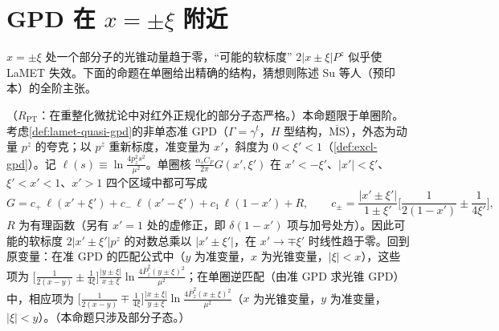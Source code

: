\section{GPD 在 $x=\pm\xi$ 附近}\label{sec:yzliu-gpd}

$x=\pm\xi$ 处一个部分子的光锥动量趋于零，“可能的软标度” $2|x\pm\xi|P^z$ 似乎使 LaMET 失效。下面的命题在单圈给出精确的结构，猜想则陈述 Su 等人\cite{Su:2026eta}（预印本）的全阶主张。

\begin{proposition}[准 GPD 单圈匹配核在 $x=\pm\xi$ 附近的结构 \tagR]\label{prop:yzliu-gpd-oneloop}
（$R_{\mathrm{PT}}$：在重整化微扰论中对红外正规化的部分子态严格。）本命题限于单圈阶。考虑\cref{def:lamet-quasi-gpd}的非单态准 GPD（$\Gamma=\gamma^t$，$H$ 型结构，$\overline{\mathrm{MS}}$），外态为动量 $p^z$ 的夸克；以 $p^z$ 重新标度，准变量为 $x'$，斜度为 $0<\xi'<1$（\cref{def:excl-gpd}）。记 $\ell(s)\equiv\ln\frac{4p_z^2s^2}{\mu^2}$。单圈核 $\frac{\alpha_sC_F}{2\pi}G(x',\xi')$ 在 $x'<-\xi'$、$|x'|<\xi'$、$\xi'<x'<1$、$x'>1$ 四个区域中都可写成 %
\begin{equation}\label{eq:yzliu-gpd-decomp}
G=c_+\,\ell(x'+\xi')+c_-\,\ell(x'-\xi')+c_1\,\ell(1-x')+R,\qquad c_\pm=\frac{|x'\pm\xi'|}{1\pm\xi'}\Big[\frac1{2(1-x')}\pm\frac1{4\xi'}\Big],
\end{equation}
$R$ 为有理函数（另有 $x'=1$ 处的虚修正，即 $\delta(1-x')$ 项与加号处方）。因此可能的软标度 $2|x'\pm\xi'|p^z$ 的对数总乘以 $|x'\pm\xi'|$，在 $x'\to\mp\xi'$ 时线性趋于零。回到原变量：在准 GPD 的匹配公式中（$y$ 为准变量，$x$ 为光锥变量，$|\xi|<x$），这些项为 $\big[\frac1{2(x-y)}\pm\frac1{4\xi}\big]\frac{|y\pm\xi|}{x\pm\xi}\ln\frac{4\bar P_z^2(y\pm\xi)^2}{\mu^2}$；在单圈逆匹配（由准 GPD 求光锥 GPD）中，相应项为 $\big[\frac1{2(x-y)}\mp\frac1{4\xi}\big]\frac{|x\pm\xi|}{y\pm\xi}\ln\frac{4\bar P_z^2(x\pm\xi)^2}{\mu^2}$（$x$ 为光锥变量，$y$ 为准变量，$|\xi|<y$）。（本命题只涉及部分子态。）
\end{proposition}

